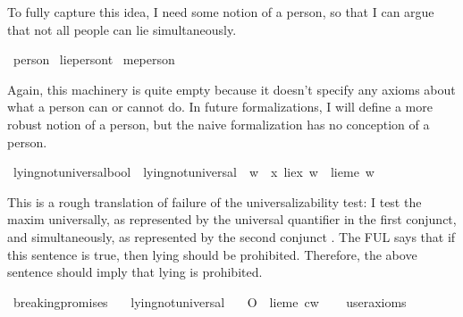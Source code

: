 \begin{isabellebody}
\begin{isamarkuptext}
To fully capture this idea, I need some notion of
a person, so that I can argue that not all people can lie simultaneously.%
\end{isamarkuptext}\isamarkuptrue%
\isamarkupfalse%
\ person\isanewline
{}\isamarkupfalse%
\ lie{\isacharcolon}{\isacharcolon}{\isachardoublequoteopen}person{\isasymRightarrow}t{\isachardoublequoteclose}\isanewline
{}\isamarkupfalse%
\ me{\isacharcolon}{\isacharcolon}{\isachardoublequoteopen}person{\isachardoublequoteclose}%
\begin{isamarkuptext}%
Again, this machinery is quite empty because it doesn't specify any axioms about what a person can 
or cannot do. In future formalizations, I will define a more robust notion of a person, but the naive 
formalization has no conception of a person.%
\end{isamarkuptext}\isamarkuptrue%
\isamarkupfalse%
\ lying{\isacharunderscore}not{\isacharunderscore}universal{\isacharcolon}{\isacharcolon}{\isachardoublequoteopen}bool{\isachardoublequoteclose}\ \ {\isachardoublequoteopen}lying{\isacharunderscore}not{\isacharunderscore}universal\ {\isasymequiv}\ {\isasymforall}w{\isachardot}\ {\isasymnot}\ {\isacharparenleft}{\isacharparenleft}{\isasymforall}x{\isachardot}\ lie{\isacharparenleft}x{\isacharparenright}\ w{\isacharparenright}\ {\isasymand}\ {\isacharparenleft}lie{\isacharparenleft}me{\isacharparenright}\ w{\isacharparenright}{\isacharparenright}{\isachardoublequoteclose}%
\begin{isamarkuptext}%
This is a rough translation of failure of the universalizability test: I  test the maxim universally,
as represented by the universal quantifier in the first conjunct, and simultaneously, as represented by 
the second conjunct \citep{simul}. The FUL says that if this sentence is true, then lying should be prohibited. 
Therefore, the above sentence should imply that lying is prohibited.%
\end{isamarkuptext}\isamarkuptrue%
\isamarkupfalse%
\ breaking{\isacharunderscore}promises{\isacharcolon}\isanewline
\ \ \ lying{\isacharunderscore}not{\isacharunderscore}universal\isanewline
\ \ \ {\isachardoublequoteopen}{\isacharparenleft}O\ {\isacharbraceleft}\isactrlbold {\isasymnot}\ {\isacharparenleft}lie{\isacharparenleft}me{\isacharparenright}{\isacharparenright}{\isacharbraceright}{\isacharparenright}\ cw{\isachardoublequoteclose}\isanewline
\ \ \isamarkupfalse%
\ {\isacharbrackleft}user{\isacharunderscore}axioms{\isacharbrackright}\isanewline
%
\isadelimproof
\ \ %
\endisadelimproof
%
\isatagproof
{}\isamarkupfalse%
\isanewline
%
\end{isabellebody}
